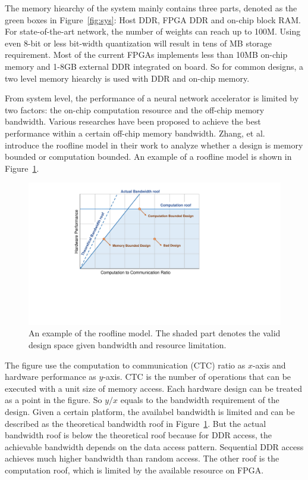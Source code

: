 The memory hiearchy of the system mainly contains three parts, denoted as the green boxes in Figure~\ref{fig:sys}: Host DDR, FPGA DDR and on-chip block RAM. For state-of-the-art network, the number of weights can reach up to 100M. Using even 8-bit or less bit-width quantization will result in tens of MB storage requirement. Most of the current FPGAs implements less than 10MB on-chip memory and 1-8GB external DDR integrated on board. So for common designs, a two level memory hiearchy is used with DDR and on-chip memory. 

From system level, the performance of a neural network accelerator is limited by two factors: the on-chip computation resource and the off-chip memory bandwidth. Various researches have been proposed to achieve the best performance within a certain off-chip memory bandwidth. Zhang, et al.~\cite{zhang2015optimizing} introduce the roofline model in their work to analyze whether a design is memory bounded or computation bounded. An example of a roofline model is shown in Figure~\ref{fig:roofline}.

\begin{figure}[h]
    \centering
    \includegraphics[width=0.6\columnwidth]{fig/roofline.pdf}
    \caption{An example of the roofline model. The shaded part denotes the valid design space given bandwidth and resource limitation.}
    \label{fig:roofline}
\end{figure}

The figure use the computation to communication (CTC) ratio as $x$-axis and hardware performance as $y$-axis. CTC is the number of operations that can be executed with a unit size of memory access. Each hardware design can be treated as a point in the figure. So $y/x$ equals to the bandwidth requirement of the design. Given a certain platform, the availabel bandwidth is limited and can be described as the theoretical bandwidth roof in Figure~\ref{fig:roofline}. But the actual bandwidth roof is below the theoretical roof because for DDR access, the achievable bandwidth depends on the data access pattern. Sequential DDR access achieves much higher bandwidth than random access. The other roof is the computation roof, which is limited by the available resource on FPGA.

